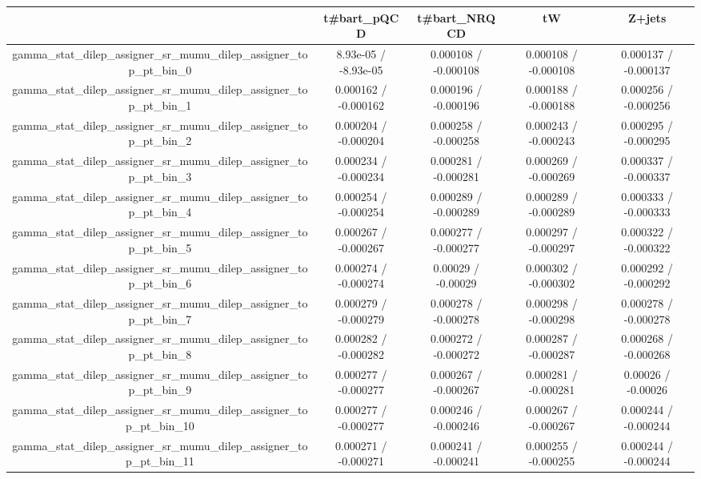 \documentclass[10pt]{article}
\begin{document}
\begin{table}[htbp]
\begin{center}
\begin{tabular}{|c|c|c|c|c|}
\hline 
      & t#bar{t}_{pQCD}      & t#bar{t}_{NRQCD}      & tW      & Z+jets \\ 
\hline 
  gamma_stat_dilep_assigner_sr_mumu_dilep_assigner_top_pt_bin_0 & 8.93e-05 / -8.93e-05 & 0.000108 / -0.000108 & 0.000108 / -0.000108 & 0.000137 / -0.000137 \\ 
  gamma_stat_dilep_assigner_sr_mumu_dilep_assigner_top_pt_bin_1 & 0.000162 / -0.000162 & 0.000196 / -0.000196 & 0.000188 / -0.000188 & 0.000256 / -0.000256 \\ 
  gamma_stat_dilep_assigner_sr_mumu_dilep_assigner_top_pt_bin_2 & 0.000204 / -0.000204 & 0.000258 / -0.000258 & 0.000243 / -0.000243 & 0.000295 / -0.000295 \\ 
  gamma_stat_dilep_assigner_sr_mumu_dilep_assigner_top_pt_bin_3 & 0.000234 / -0.000234 & 0.000281 / -0.000281 & 0.000269 / -0.000269 & 0.000337 / -0.000337 \\ 
  gamma_stat_dilep_assigner_sr_mumu_dilep_assigner_top_pt_bin_4 & 0.000254 / -0.000254 & 0.000289 / -0.000289 & 0.000289 / -0.000289 & 0.000333 / -0.000333 \\ 
  gamma_stat_dilep_assigner_sr_mumu_dilep_assigner_top_pt_bin_5 & 0.000267 / -0.000267 & 0.000277 / -0.000277 & 0.000297 / -0.000297 & 0.000322 / -0.000322 \\ 
  gamma_stat_dilep_assigner_sr_mumu_dilep_assigner_top_pt_bin_6 & 0.000274 / -0.000274 & 0.00029 / -0.00029 & 0.000302 / -0.000302 & 0.000292 / -0.000292 \\ 
  gamma_stat_dilep_assigner_sr_mumu_dilep_assigner_top_pt_bin_7 & 0.000279 / -0.000279 & 0.000278 / -0.000278 & 0.000298 / -0.000298 & 0.000278 / -0.000278 \\ 
  gamma_stat_dilep_assigner_sr_mumu_dilep_assigner_top_pt_bin_8 & 0.000282 / -0.000282 & 0.000272 / -0.000272 & 0.000287 / -0.000287 & 0.000268 / -0.000268 \\ 
  gamma_stat_dilep_assigner_sr_mumu_dilep_assigner_top_pt_bin_9 & 0.000277 / -0.000277 & 0.000267 / -0.000267 & 0.000281 / -0.000281 & 0.00026 / -0.00026 \\ 
  gamma_stat_dilep_assigner_sr_mumu_dilep_assigner_top_pt_bin_10 & 0.000277 / -0.000277 & 0.000246 / -0.000246 & 0.000267 / -0.000267 & 0.000244 / -0.000244 \\ 
  gamma_stat_dilep_assigner_sr_mumu_dilep_assigner_top_pt_bin_11 & 0.000271 / -0.000271 & 0.000241 / -0.000241 & 0.000255 / -0.000255 & 0.000244 / -0.000244 \\ 

\end{tabular}
\end{center}
\end{table}
\end{document}
